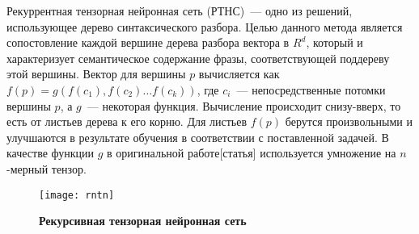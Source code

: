 Рекуррентная тензорная нейронная сеть (РТНС)~--- одно из решений, использующее дерево синтаксического разбора. Целью данного метода является сопостовление каждой вершине дерева разбора вектора в $R^d$, 
который и характеризует семантическое содержание фразы, соответствующей поддереву этой вершины.
Вектор для вершины $p$ вычисляется как $f(p)=g(f(c_1), f(c_2) \dots{} f(c_k))$, где $c_i$~--- непосредственные потомки вершины $p$, а $g$~--- некоторая функция. Вычисление происходит снизу-вверх, то
есть от листьев дерева к его корню. Для листьев $f(p)$ берутся произвольными и улучшаются в результате обучения в соответствии с поставленной задачей.
В качестве функции $g$ в оригинальной работе[статья] используется умножение на $n$-мерный тензор.

\begin{figure}[h]
\texttt{[image: rntn]}
\caption{\textbf{Рекурсивная тензорная нейронная сеть}}
\label{fig:rntn}
\end{figure}
 





